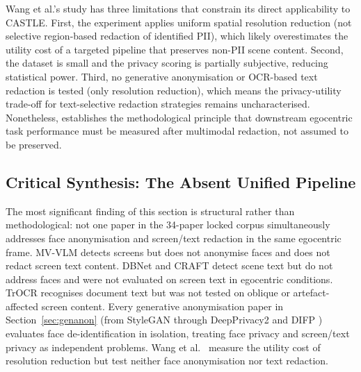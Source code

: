 \documentclass[12pt, onecolumn]{IEEEtran}
\begin{document}
Wang et al.'s study has three limitations that constrain its direct
applicability to CASTLE. First, the experiment applies uniform spatial
resolution reduction (not selective region-based redaction of identified PII),
which likely overestimates the utility cost of a targeted pipeline that
preserves non-PII scene content. Second, the dataset is small and the
privacy scoring is partially subjective, reducing statistical power.
Third, no generative anonymisation or OCR-based text redaction is
tested (only resolution reduction), which means the privacy-utility
trade-off for text-selective redaction strategies remains uncharacterised.
Nonetheless, \cite{wang2023modeling} establishes the methodological
principle that downstream egocentric task performance must be measured
after multimodal redaction, not assumed to be preserved.

\subsection{Critical Synthesis: The Absent Unified Pipeline}

The most significant finding of this section is structural rather than
methodological: not one paper in the 34-paper locked corpus
simultaneously addresses face anonymisation and screen/text redaction
in the same egocentric frame. MV-VLM \cite{li2026screen} detects
screens but does not anonymise faces and does not redact screen text
content. DBNet \cite{liao2020dbnet} and CRAFT \cite{baek2019craft}
detect scene text but do not address faces and were not evaluated on
screen text in egocentric conditions. TrOCR \cite{li2023trocr}
recognises document text but was not tested on oblique or
artefact-affected screen content. Every generative anonymisation paper
in Section~\ref{sec:genanon} (from StyleGAN \cite{khorzooghi2023gan}
through DeepPrivacy2 \cite{hukkelas2023deepprivacy2} and DIFP
\cite{you2024difp}) evaluates face de-identification in isolation,
treating face privacy and screen/text privacy as independent problems.
Wang et al.\ \cite{wang2023modeling} measure the utility cost of
resolution reduction but test neither face anonymisation nor text redaction.
\end{document}
